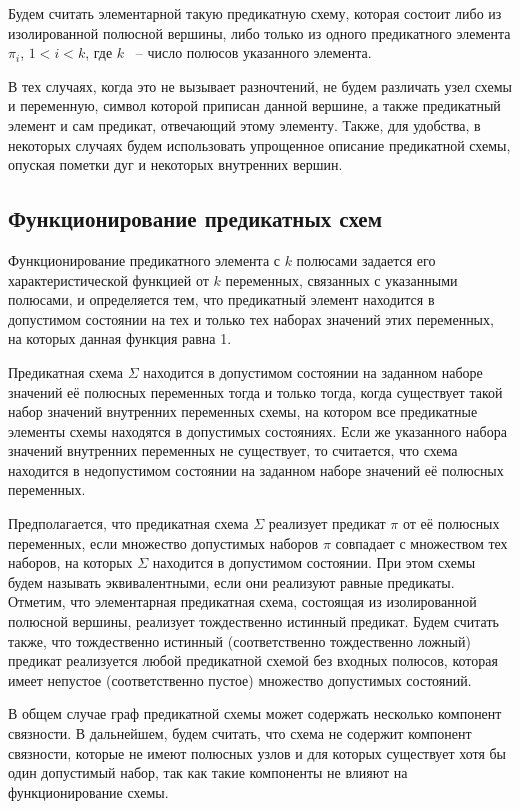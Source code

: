 \documentclass[12pt]{article}
\begin{document}
Будем считать элементарной такую предикатную схему, которая состоит либо из изолированной полюсной вершины, 
либо только из одного предикатного элемента $\pi_i$, $1 < i < k$, где $k$ ~-- число полюсов указанного элемента.

В тех случаях, когда это не вызывает разночтений, 
не будем различать узел схемы и переменную, 
символ которой приписан данной вершине, а также предикатный элемент и сам предикат, отвечающий этому элементу. 
Также, для удобства, в некоторых случаях будем использовать упрощенное описание предикатной схемы, 
опуская пометки дуг и некоторых внутренних вершин. 

\subsection{Функционирование предикатных схем}
Функционирование предикатного элемента с $k$ полюсами задается его характеристической функцией от $k$ переменных, 
связанных с указанными полюсами, и определяется тем, что предикатный элемент находится в допустимом состоянии на тех и 
только тех наборах значений этих переменных, на которых данная функция равна 1. 

Предикатная схема $\Sigma$ находится в допустимом состоянии на заданном наборе значений её полюсных переменных тогда и только тогда, 
когда существует такой набор значений внутренних переменных схемы, на котором все предикатные элементы схемы находятся в допустимых состояниях. 
Если же указанного набора значений внутренних переменных не существует, то считается, что схема находится в недопустимом состоянии на 
заданном наборе значений её полюсных переменных.

Предполагается, что предикатная схема $\Sigma$ реализует предикат $\pi$ от её полюсных переменных, если множество допустимых наборов $\pi$ 
совпадает с множеством тех наборов, на которых $\Sigma$ находится в допустимом состоянии. 
При этом схемы будем называть эквивалентными, если они реализуют равные предикаты. 
Отметим, что элементарная предикатная схема, состоящая из изолированной полюсной вершины, реализует тождественно истинный предикат.
 Будем считать также, что тождественно истинный (соответственно тождественно ложный)
 предикат реализуется любой предикатной схемой без входных полюсов, 
которая имеет непустое (соответственно пустое) множество допустимых состояний.

В общем случае граф предикатной схемы может содержать несколько компонент связности. 
В дальнейшем, будем считать, что схема не содержит компонент связности, 
которые не имеют полюсных узлов и для которых существует хотя бы один допустимый набор, так как такие компоненты не влияют на функционирование схемы.
\end{document}
